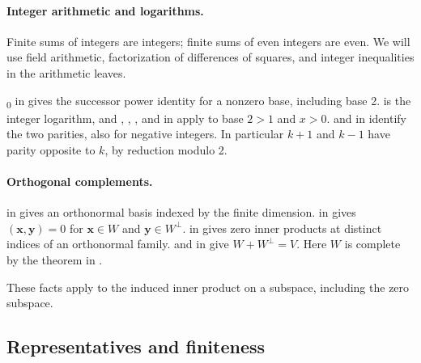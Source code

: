 \documentclass[11pt]{amsart}
\newcommand\Zy{{\mathbf y}}
\newcommand\Zx{{\mathbf x}}
\begin{document}
\paragraph{Integer arithmetic and logarithms.}\label{facts:312-arithmetic}\uses{}
Finite sums of integers are integers; finite sums of even integers are even.
We will use field arithmetic, factorization of differences of squares,
and integer inequalities in the arithmetic leaves.
\begingroup\raggedright
{}\textsubscript{0} in
 gives the successor
power identity for a nonzero base, including base 2.
 is the integer logarithm, and
, ,
, and 
in  apply to base $2>1$ and $x>0$.
 and  in
 identify the two parities,
also for negative integers. In particular $k+1$ and $k-1$ have
parity opposite to $k$, by reduction modulo 2.
\par\endgroup

\paragraph{Orthogonal complements.}\label{facts:312-orthogonal}\uses{}
\begingroup\raggedright
{} in
gives an orthonormal basis indexed by the finite dimension.
 in
 gives
$(\Zx,\Zy)=0$ for $\Zx\in W$ and $\Zy\in W^\perp$.
 in
 gives zero
inner products at distinct indices of an orthonormal family.
 and
 in
give $W+W^\perp=V$. Here $W$ is complete by the theorem
 in
.
\par\endgroup
These facts apply to the induced inner product on a subspace, including
the zero subspace.

\subsection{Representatives and finiteness}
\end{document}
